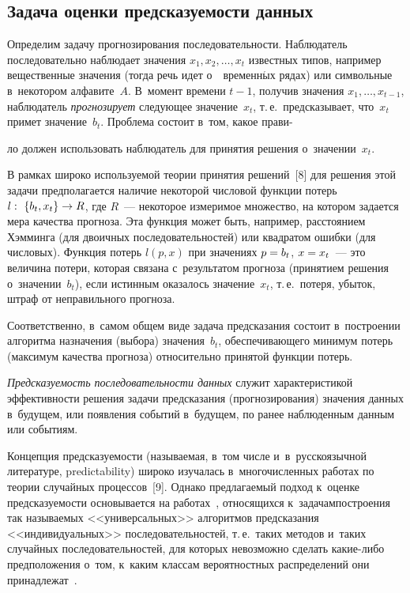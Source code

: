\begin{multicols}{2}
\vspace*{-9pt}

\section{Задача оценки предсказуемости данных}

\vspace*{-2pt}

  Определим задачу прогнозирования последовательности. Наблюдатель 
последовательно наблюдает значения $x_1, x_2, \ldots , x_t$ известных типов, 
например вещественные значения (тогда речь идет о~~временн$\acute{\mbox{ы}}$х рядах) или 
символьные в~некотором алфавите~$A$. В~момент времени $t-1$, получив 
значения $x_1, \ldots , x_{t-1}$, наблюдатель \textit{прогнозирует} сле\-ду\-ющее 
значение~$x_t$, т.\,е.\ предсказывает, что~$x_t$ примет значение~$b_t$. 
Проблема состоит в~том, какое прави-\linebreak\vspace*{-12pt}

\pagebreak

\noindent
ло должен использовать наблюдатель 
для принятия решения о~значении~$x_t$.
    
  В рамках широко используемой теории принятия решений~[8] для 
решения этой задачи предполагается наличие некоторой числовой функции 
потерь~$l:\ \{b_t, x_t\}\hm\to {R}$, где ${R}$~--- некоторое 
измеримое множество, на котором задается мера качества прогноза. Эта 
функция может быть, например, расстоянием Хэмминга (для двоичных 
последовательностей) или квадратом ошибки (для числовых). Функция 
потерь $l(p, x)$ при значениях $p\hm = b_t$, $x\hm = x_t$~--- это величина 
потери, которая связана с~результатом прогноза (принятием решения 
о~значении~$b_t$), если истинным оказалось значение~$x_t$, т.\,е.\ потеря, 
убыток, штраф от неправильного прогноза. 
  
  Соответственно, в~самом общем виде задача предсказания состоит 
в~построении алгоритма назначения (выбора) значения~$b_t$, 
обеспечивающего минимум потерь (максимум качества прогноза) 
относительно принятой функции потерь.
  
  \textit{Предсказуемость последовательности данных} служит 
характеристикой эффективности решения задачи предсказания 
(прогнозирования) значения данных в~будущем, или появления событий 
в~будущем, по ранее наблюденным данным или со\-бы\-тиям. 
  
  Концепция предсказуемости (называемая, в~том числе и~в~русскоязычной 
литературе, predictability) широко изучалась в~многочисленных работах по 
теории случайных процессов~[9]. Однако предлагаемый подход к~оценке 
предсказуемости основывается на работах~\cite{4-fr, 5-fr, 6-fr, 11-fr}, 
относящихся к~задачам\linebreak построения так называемых <<универсальных>> 
алгоритмов предсказания <<индивидуальных>> последо\-ва\-тель\-ностей, т.\,е.\ 
таких методов и~таких случайных последовательностей, для которых 
невозможно сделать ка\-кие-ли\-бо предположения о~том, к~каким классам 
вероятностных распределений они принадлежат~\cite{10-fr}.
   

\end{multicols}
